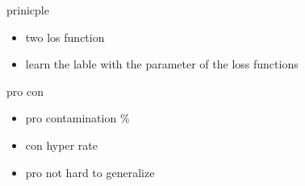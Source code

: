 \documentclass[../description.tex]{subfiles}
\begin{document}
    \item prinicple
    \begin{itemize}
        \item two los function 
        \item learn the lable with the parameter of the loss functions
    \end{itemize}
    \item pro con 
    \begin{itemize}
        \item pro contamination \%
        \item con hyper rate 
        \item pro not hard to generalize 
    \end{itemize}
\end{document}
